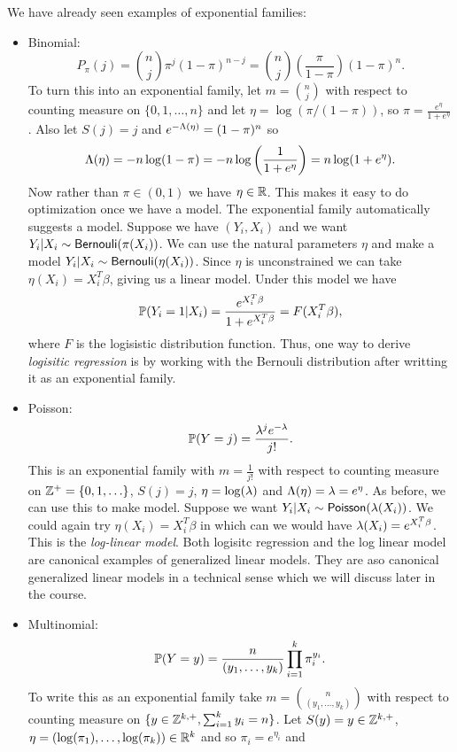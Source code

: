 \begin{examples}
    We have already seen examples of exponential families:
    \begin{itemize}
        \item Binomial:
        \[P_\pi(j) = \binom{n}{j}\pi^j (1-\pi)^{n-j} =\binom{n}{j}\left(\frac{\pi}{1-\pi}\right)(1-\pi)^{n}. \]
        To turn this into an exponential family, let $m = \binom{n}{j}$ with respect to counting measure on $\{0,1,\ldots,n\}$ and let $\eta = \log(\pi/(1-\pi))$, so $\pi = \frac{e^\eta}{1+e^{\eta}}$. Also let $S(j)=j$ and $e^{-\Lambda(\eta)} =(1-\pi)^n$ so 
        \[\Lambda(\eta) = -n\log(1-\pi)=-n\log\left(\frac{1}{1+e^{\eta}}\right)=n\log(1+e^{\eta}).\]
        Now rather than $\pi \in (0,1)$ we have $\eta \in {\mathbb R}$. This makes it easy to do optimization once we have a model. The exponential family automatically suggests a model. Suppose we have $(Y_i,X_i)$ and we want $Y_i |X_i \sim \mathsf{Bernouli}(\pi(X_i))$. We can use the natural parameters $\eta$ and make a model $Y_i |X_i \sim \mathsf{Bernouli}(\eta(X_i))$. Since $\eta$ is unconstrained we can take $\eta(X_i) = X_i^T\beta$, giving us a linear model. Under this model we have
        \[{\mathbb{P}}(Y_i=1|X_i) = \frac{e^{X_i^T\beta}}{1+e^{X_i^T\beta}} = F(X_i^T\beta), \]
        where $F$ is the logisistic distribution function. Thus, one way to derive \emph{logisitic regression} is by working with the Bernouli distribution after writting it as an exponential family.
        \item Poisson:
        \[{\mathbb{P}}(Y = j) = \frac{\lambda^j e^{-\lambda}}{j!}.\] 
        This is an exponential family with $m= \frac{1}{j!}$ with respect to counting measure on ${{\mathbb Z}}^+=\{0,1,\ldots \}$, $S(j)=j$, $\eta = \log(\lambda)$ and $\Lambda(\eta)=\lambda = e^{\eta}$. As before, we can use this to make model. Suppose we want $Y_i|X_i \sim \mathsf{Poisson}(\lambda(X_i))$. We could again try $\eta(X_i)=X_i^T\beta$ in which can we would have $\lambda(X_i) = e^{X_i^T\beta}$. This is the \emph{log-linear model}. Both logisitc regression and the log linear model are canonical examples of generalized linear models. They are aso canonical generalized linear models in a technical sense which we will discuss later in the course.
        \item Multinomial: 
        \[{\mathbb{P}}(Y=y) = \frac{n}{(y_1,\ldots,y_k)}\prod_{i=1}^k \pi_i^{y_i}.\] To write this as an exponential family take $m=\binom{n}{(y_1,\ldots,y_k)}$ with respect to counting measure on $\{y \in {{\mathbb Z}}^{k,+}, \sum_{i=1}^k y_i = n\}$. Let $S(y)=y \in {{\mathbb Z}}^{k,+}$, $\eta = (\log(\pi_1),\ldots,\log(\pi_k)) \in {\mathbb R}^k$ and so $\pi_i = e^{\eta_i}$ and 

\end{itemize}
\end{examples}
